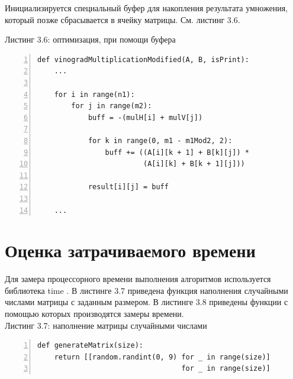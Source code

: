 \documentclass[12pt,a4paper]{report}
\begin{document}
Инициализируется специальный буфер для накопления результата умножения, который позже сбрасывается 
в ячейку матрицы. См. листинг 3.6.

\textrm{Листинг 3.6: оптимизация, при помощи буфера}
\begin{lstlisting}[frame=single, numbers=left]
def vinogradMultiplicationModified(A, B, isPrint):
    ...

    for i in range(n1):
        for j in range(m2):
            buff = -(mulH[i] + mulV[j])

            for k in range(0, m1 - m1Mod2, 2):
                buff += ((A[i][k + 1] + B[k][j]) * 
                         (A[i][k] + B[k + 1][j]))

            result[i][j] = buff

    ...
\end{lstlisting}

\section{Оценка затрачиваемого времени}

Для замера процессорного времени выполнения алгоритмов используется библиотека time \cite{time_bib}. 
В листинге 3.7 приведена функция наполнения случайными числами матрицы с заданным размером. 
В листинге 3.8 приведены функции с помощью которых производятся замеры времени. \\

\textrm{Листинг 3.7: наполнение матрицы случайными числами}
\begin{lstlisting}[frame=single, numbers=left]
def generateMatrix(size):
    return [[random.randint(0, 9) for _ in range(size)] 
                                  for _ in range(size)]
\end{lstlisting}
\end{document}
